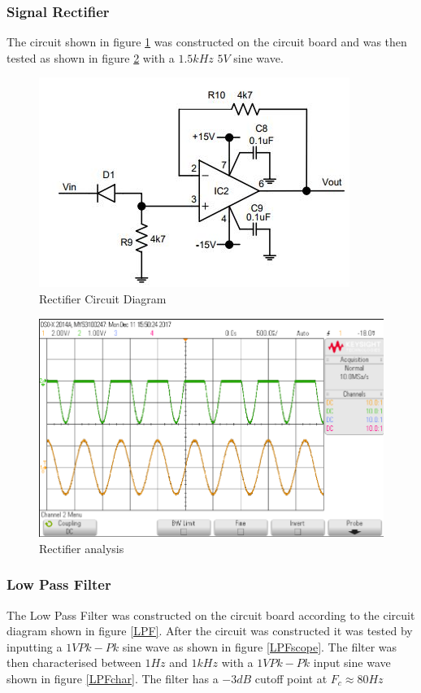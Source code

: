 \documentclass[10pt,a4paper]{article}
\begin{document}
\subsubsection{Signal Rectifier}
The circuit shown in figure \ref{RecDia} was constructed on the circuit board and was then tested as shown in figure \ref{Rectifier} with a $1.5kHz$ $5V$ sine wave.





\begin{figure}[!h]
\includegraphics[scale= 0.75]{rectifierdia}
\caption{Rectifier Circuit Diagram}
\label{RecDia}
\end{figure}

\begin{figure}[!h]
\includegraphics[scale= 0.5]{rectifier}
\caption{Rectifier analysis}
\label{Rectifier}
\end{figure}
\subsubsection{Low Pass Filter}
The Low Pass Filter was constructed on the circuit board according to the circuit diagram shown in figure \ref{LPF}. After the circuit was constructed it was tested by inputting a $1V Pk-Pk$ sine wave as shown in figure \ref{LPFscope}. The filter was then characterised between $1Hz$ and $1kHz$ with a $1V Pk-Pk$ input sine wave shown in figure \ref{LPFchar}. The filter has a $-3dB$ cutoff point at $F_c \approx 80Hz$ 
\end{document}
